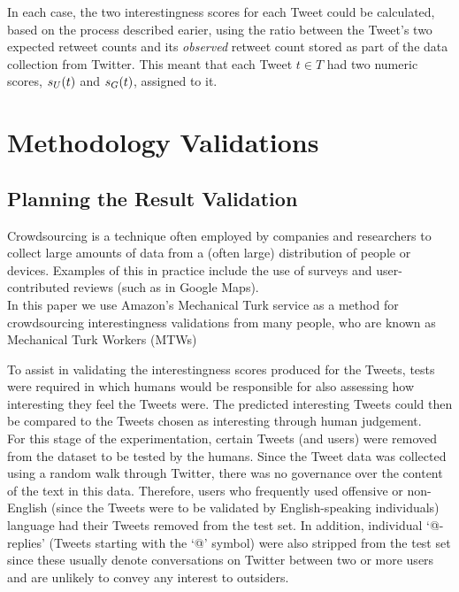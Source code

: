 In each case, the two interestingness scores for each Tweet could be calculated, based on the process described earier, using the ratio between the Tweet's two expected retweet counts and its \textit{observed} retweet count stored as part of the data collection from Twitter. This meant that each Tweet $t \in T$ had two numeric scores, $s_U(t)$ and $s_G(t)$, assigned to it. 



\section{Methodology Validations}


\subsection{Planning the Result Validation}
Crowdsourcing is a technique often employed by companies and researchers to collect large amounts of data from a (often large) distribution of people or devices. Examples of this in practice include the use of surveys and user-contributed reviews (such as in Google Maps).\\
In this paper we use Amazon's Mechanical Turk service as a method for crowdsourcing interestingness validations from many people, who are known as Mechanical Turk Workers (MTWs) 

To assist in validating the interestingness scores produced for the Tweets, tests were required in which humans would be responsible for also assessing how interesting they feel the Tweets were. The predicted interesting Tweets could then be compared to the Tweets chosen as interesting through human judgement.\\
For this stage of the experimentation, certain Tweets (and users) were removed from the dataset to be tested by the humans. Since the Tweet data was collected using a random walk through Twitter, there was no governance over the content of the text in this data. Therefore, users who frequently used offensive or non-English (since the Tweets were to be validated by English-speaking individuals) language had their Tweets removed from the test set. In addition, individual `@-replies' (Tweets starting with the `@' symbol) were also stripped from the test set since these usually denote conversations on Twitter between two or more users and are unlikely to convey any interest to outsiders.


